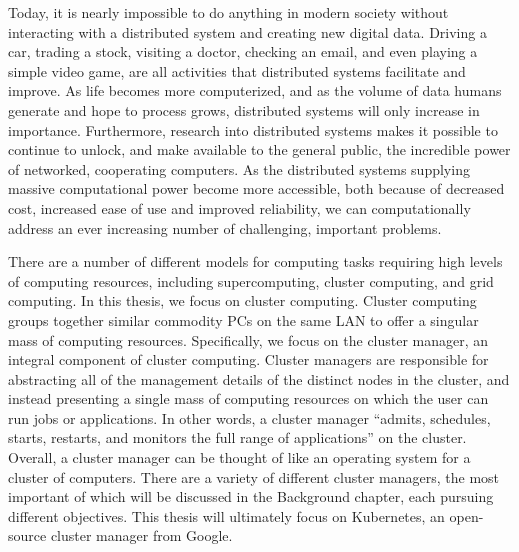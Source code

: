 Today, it is nearly impossible to do
anything in modern society without interacting with a distributed system and
creating new digital data. Driving a car, trading a stock, visiting a doctor,
checking an email, and even playing a simple video game, are all activities that
distributed systems facilitate and improve.\cite[pg.
4]{distributed-systems-concepts-and-design} As life becomes more
computerized, and as the volume of data humans generate and hope to process
grows, distributed systems will only increase in importance.
Furthermore, research into distributed systems makes it possible to
continue to unlock, and make available to the general public,
the incredible power of networked, cooperating computers. As the distributed systems
supplying massive computational power become more
accessible, both because of decreased cost, increased ease of use and
improved reliability, we can
computationally address an ever increasing number of challenging, important problems.

There are a number of different models for computing tasks requiring high levels
of computing resources, including supercomputing, cluster computing, and grid
computing. In this thesis, we focus on cluster computing. Cluster computing
groups together similar commodity PCs on the same LAN to offer a singular mass
of computing resources. Specifically, we focus on the
cluster manager, an integral component of cluster computing. Cluster managers
are responsible for abstracting all of the management details of the distinct
nodes in the cluster, and instead presenting a single mass of computing resources
on which the user can run jobs or applications. In other words,
a cluster manager ``admits, schedules, starts, restarts, and monitors the full
range of applications'' on the cluster.\cite[pg. 1]{borg} Overall, a cluster
manager can be thought of like an operating system for a cluster of computers. There are a
variety of different cluster managers, the most important of which will be
discussed in the Background chapter, each pursuing different objectives. This
thesis will ultimately focus on Kubernetes, an open-source cluster
manager from Google.\cite{k8s-website}

